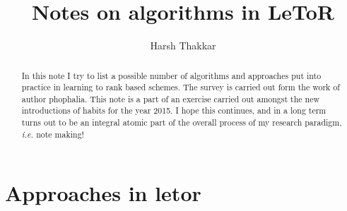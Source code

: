 \documentclass[]{article}
\title{Notes on algorithms in LeToR}
\author{Harsh Thakkar}
\begin{document}
\maketitle

\begin{abstract}
In this note I try to list a possible number of algorithms and approaches put into practice in learning to rank based schemes. The survey is carried out form the work of author phophalia. This note is a part of an exercise carried out amongst the new introductions of habits for the year 2015. I hope this continues, and in a long term turns out to be an integral atomic part of the overall process of my research paradigm, \textit{i.e.} note making!

\end{abstract}

\section{Approaches in letor}
\end{document}
